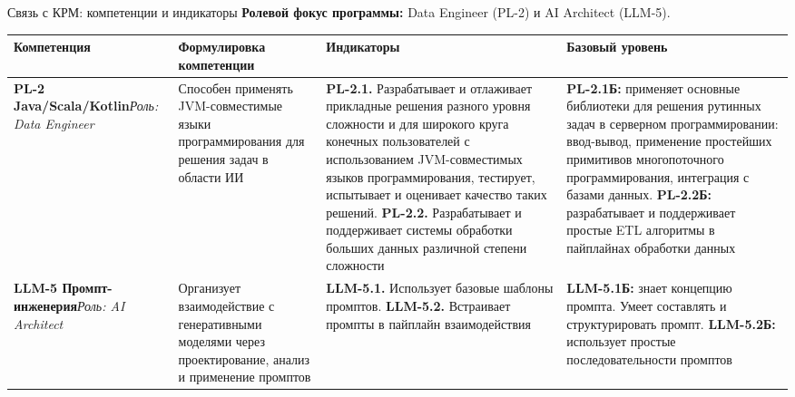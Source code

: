 \documentclass[aspectratio=169,10pt]{beamer}
\begin{document}
\begin{frame}{Связь с КРМ: компетенции и индикаторы}
\scriptsize
\textbf{Ролевой фокус программы:} Data Engineer (PL-2) и AI Architect (LLM-5).
\vspace{0.2em}
\begin{adjustbox}{max width=\textwidth,max totalheight=0.73\textheight, center}
\begin{tabular}{L{2.8cm} L{4.2cm} L{5.5cm} L{4.2cm}}
\toprule
\textbf{Компетенция} & \textbf{Формулировка компетенции} & \textbf{Индикаторы} & \textbf{Базовый уровень} \\
\midrule
\textbf{PL-2 Java/Scala/Kotlin}\newline\emph{Роль: Data Engineer} &
Способен применять JVM-совместимые языки программирования для решения задач в области ИИ &
\textbf{PL-2.1.} Разрабатывает и отлаживает прикладные решения разного уровня сложности и для широкого круга конечных пользователей с использованием JVM-совместимых языков программирования, тестирует, испытывает и оценивает качество таких решений.\newline
\textbf{PL-2.2.} Разрабатывает и поддерживает системы обработки больших данных различной степени сложности &
\textbf{PL-2.1Б:} применяет основные библиотеки для решения рутинных задач в серверном программировании: ввод-вывод, применение простейших примитивов многопоточного программирования, интеграция с базами данных.\newline
\textbf{PL-2.2Б:} разрабатывает и поддерживает простые ETL алгоритмы в пайплайнах обработки данных \\
\midrule
\textbf{LLM-5 Промпт-инженерия}\newline\emph{Роль: AI Architect} &
Организует взаимодействие с генеративными моделями через проектирование, анализ и применение промптов &
\textbf{LLM-5.1.} Использует базовые шаблоны промптов.\newline
\textbf{LLM-5.2.} Встраивает промпты в пайплайн взаимодействия &
\textbf{LLM-5.1Б:} знает концепцию промпта. Умеет составлять и структурировать промпт.\newline
\textbf{LLM-5.2Б:} использует простые последовательности промптов \\
\bottomrule
\end{tabular}
\end{adjustbox}

\end{frame}
\end{document}
